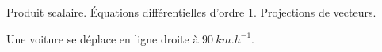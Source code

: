 \debutFicheEntrainement                                                                      %




\begin{prerequis}
	Produit scalaire. Équations différentielles d'ordre 1. Projections de 
	vecteurs.
\end{prerequis}













\hauteurLargeurCadreReponse		{7mm}{3.5cm}
\initialisationEntrainement

Une voiture se déplace en ligne droite à $\SI{90}{km.h^{-1}}$.

